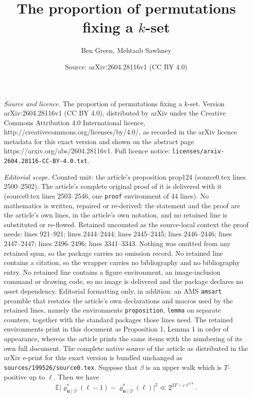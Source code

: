 \documentclass[10pt,a4paper]{amsart}
\title{The proportion of permutations fixing a $k$-set}
\author{Ben Green, Mehtaab Sawhney}
\date{Source: arXiv:2604.28116v1 (CC BY 4.0)}
\newcommand{\mb}{\mathbb}
\newcommand{\mbf}{\mathbf}
\begin{document}
\maketitle

\noindent\emph{Source and licence.} The proportion of permutations fixing a $k$-set. Version arXiv:2604.28116v1 (CC BY 4.0), distributed by arXiv under the Creative Commons Attribution 4.0 International licence, http://creativecommons.org/licenses/by/4.0/, as recorded in the arXiv licence metadata for this exact version and shown on the abstract page https://arxiv.org/abs/2604.28116v1. Full licence notice: \texttt{licenses/arxiv-2604.28116-CC-BY-4.0.txt}.\par\smallskip

\noindent\textit{Editorial scope.} Counted unit: the article's proposition prop124 (source0.tex lines 2500--2502). The article's complete original proof of it is delivered with it (source0.tex lines 2503--2546, one \texttt{proof} environment of 44 lines). No mathematics is written, repaired or re-derived: the statement and the proof are the article's own lines, in the article's own notation, and no retained line is substituted or re-flowed.  Retained uncounted as the source-local context the proof needs: lines 921--921; lines 2444--2444; lines 2445--2445; lines 2446--2446; lines 2447--2447; lines 2496--2496; lines 3341--3343.  Nothing was omitted from any retained span, so the package carries no omission record.  No retained line contains a citation, so the wrapper carries no bibliography and no bibliography entry.  No retained line contains a figure environment, an image-inclusion command or drawing code, so no image is delivered and the package declares no asset dependency.  Editorial formatting only, in addition: an AMS \texttt{amsart} preamble that restates the article's own declarations and macros used by the retained lines, namely the environments \texttt{proposition}, \texttt{lemma} on separate counters, together with the standard packages those lines need.  The retained environments print in this document as Proposition 1, Lemma 1 in order of appearance, whereas the article prints the same items with the numbering of its own full document.  The complete native source of the article as distributed in the arXiv e-print for this exact version is bundled unchanged as \texttt{sources/199526/source0.tex}.
Suppose that $\beta$ is an upper walk which is $T$-positive up to $\ell$. Then we have \begin{equation}\label{lem73-first} \mb{E} \big| \varrho^*_{\mbf{u} \mid \beta}(\ell-1) - \varrho^*_{\mbf{u} \mid \beta}(\ell) \big|^2\ll 2^{3T - c\ell^{1/4}}.\end{equation}
\end{document}
